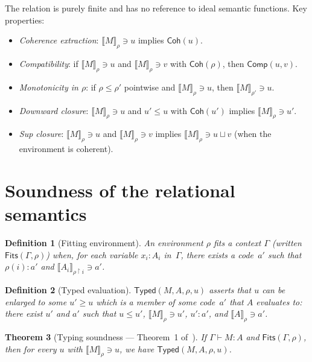 \documentclass[11pt]{article}
\newcommand{\hastype}[3]{#1 \vdash #2 : #3}
\newcommand{\LeCode}{\leq}
\newcommand{\Sup}{\sqcup}
\newcommand{\Coh}{\mathsf{Coh}}
\newcommand{\FinMem}{\mathrel{:}}
\newcommand{\EvalRel}[3]{\llbracket #1 \rrbracket_{#2} \ni #3}
\newtheorem{theorem}{Theorem}
\newtheorem{definition}[theorem]{Definition}
\begin{document}
The relation is purely finite and has no reference to ideal
semantic functions.  Key properties:
\begin{itemize}
  \item \emph{Coherence extraction}: $\EvalRel{M}{\rho}{u}$
    implies $\Coh(u)$.
  \item \emph{Compatibility}: if $\EvalRel{M}{\rho}{u}$ and
    $\EvalRel{M}{\rho}{v}$ with $\Coh(\rho)$, then
    $\mathsf{Comp}(u,v)$.
  \item \emph{Monotonicity in $\rho$}: if $\rho \LeCode \rho'$
    pointwise and $\EvalRel{M}{\rho}{u}$, then
    $\EvalRel{M}{\rho'}{u}$.
  \item \emph{Downward closure}: $\EvalRel{M}{\rho}{u}$ and
    $u' \LeCode u$ with $\Coh(u')$ implies
    $\EvalRel{M}{\rho}{u'}$.
  \item \emph{Sup closure}: $\EvalRel{M}{\rho}{u}$ and
    $\EvalRel{M}{\rho}{v}$ implies
    $\EvalRel{M}{\rho}{u \Sup v}$ (when the environment is
    coherent).
\end{itemize}

\section{Soundness of the relational semantics}

\begin{definition}[Fitting environment]
  An environment $\rho$ \emph{fits} a context $\Gamma$ (written
  $\mathsf{Fits}(\Gamma, \rho)$) when, for each variable
  $x_i : A_i$ in~$\Gamma$, there exists a code~$a'$ such that
  $\rho(i) \FinMem a'$ and $\EvalRel{A_i}{\rho{\upharpoonright i}}{a'}$.
\end{definition}

\begin{definition}[Typed evaluation]
  $\mathsf{Typed}(M,A,\rho,u)$ asserts that $u$ can be enlarged to
  some $u' \geq u$ which is a member of some code~$a'$ that
  $A$ evaluates to: there exist $u'$ and $a'$ such that
  $u \LeCode u'$, $\EvalRel{M}{\rho}{u'}$, $u' \FinMem a'$, and
  $\EvalRel{A}{\rho}{a'}$.
\end{definition}

\begin{theorem}[Typing soundness --- Theorem~1 of~\cite{CH2018}]
  \label{thm:typing-sound}
  If\/ $\hastype{\Gamma}{M}{A}$ and $\mathsf{Fits}(\Gamma, \rho)$,
  then for every $u$ with $\EvalRel{M}{\rho}{u}$,
  we have $\mathsf{Typed}(M,A,\rho,u)$.
\end{theorem}
\end{document}
